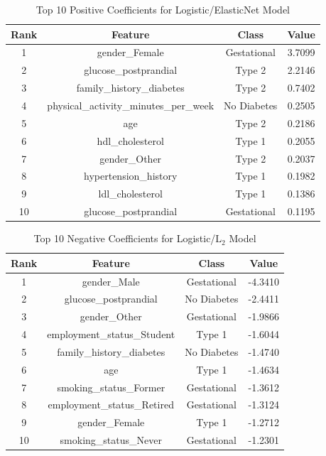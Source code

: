 \documentclass[conference]{IEEEtran}
\begin{document}
\begin{table}[h!]\centering
	\caption{Top 10 Positive Coefficients for Logistic/ElasticNet Model}
	\label{tab:elasticnet_positive_coefficients}
	\begin{tabular}{|c|c|c|c|}
		\hline
		\textbf{Rank} & \textbf{Feature} & \textbf{Class} & \textbf{Value} \\
		\hline
		1 & gender\_Female & Gestational & 3.7099 \\
		2 & glucose\_postprandial & Type 2 & 2.2146 \\
		3 & family\_history\_diabetes & Type 2 & 0.7402 \\
		4 & physical\_activity\_minutes\_per\_week & No Diabetes & 0.2505 \\
		5 & age & Type 2 & 0.2186 \\
		6 & hdl\_cholesterol & Type 1 & 0.2055 \\
		7 & gender\_Other & Type 2 & 0.2037 \\
		8 & hypertension\_history & Type 1 & 0.1982 \\
		9 & ldl\_cholesterol & Type 1 & 0.1386 \\
		10 & glucose\_postprandial & Gestational & 0.1195 \\
		\hline
	\end{tabular}
\end{table}

\begin{table}[h!]\centering
	\caption{Top 10 Negative Coefficients for Logistic/$\text{L}_2$ Model}
	\label{tab:ridge_negative_coefficients}
	\begin{tabular}{|c|c|c|c|}
		\hline
		\textbf{Rank} & \textbf{Feature} & \textbf{Class} & \textbf{Value} \\
		\hline
		1 & gender\_Male & Gestational & -4.3410 \\
		2 & glucose\_postprandial & No Diabetes & -2.4411 \\
		3 & gender\_Other & Gestational & -1.9866 \\
		4 & employment\_status\_Student & Type 1 & -1.6044 \\
		5 & family\_history\_diabetes & No Diabetes & -1.4740 \\
		6 & age & Type 1 & -1.4634 \\
		7 & smoking\_status\_Former & Gestational & -1.3612 \\
		8 & employment\_status\_Retired & Gestational & -1.3124 \\
		9 & gender\_Female & Type 1 & -1.2712 \\
		10 & smoking\_status\_Never & Gestational & -1.2301 \\
		\hline
	\end{tabular}
\end{table}
\end{document}

